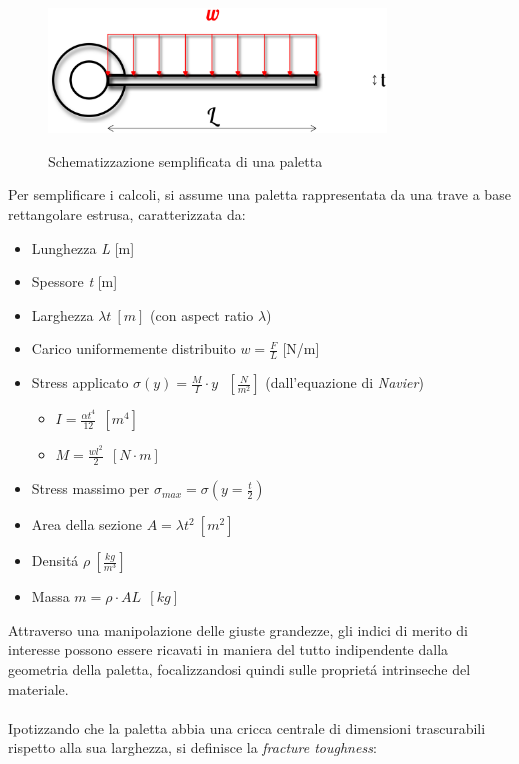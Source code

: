 \documentclass{article}
\begin{document}
        \begin{figure}[h!]
            \centering
             \label{blade_load}
            \includegraphics[width=0.8\textwidth]{Sources/blade_load.eps}
            \caption{Schematizzazione semplificata di una paletta \autocite{Inkscape}}
        \end{figure}
        \clearpage

        Per semplificare i calcoli, si assume una paletta rappresentata da una trave a base rettangolare
        estrusa, caratterizzata da:

        \begin{itemize}
            \item Lunghezza \textit{L} [m]
            \item Spessore \textit{t} [m]
            \item Larghezza $\lambda t \ [m]$ (con aspect ratio $\lambda$)
            \item Carico uniformemente distribuito $w = \frac{F}{L}$ [N/m]
            \item Stress applicato $\sigma(y) = \frac{M}{I} \cdot y \ \ \ [\frac{N}{m^2}]$ (dall'equazione di \textit{Navier})
                \begin{itemize}
                    \item $I = \frac{\alpha t^4}{12} \ \ [m^4]$ 
                    \item $M = \frac{wl^2}{2} \ \ [N \cdot m]$
                \end{itemize}
            \item Stress massimo per $\sigma_{max} = \sigma(y = \frac{t}{2})$
            \item Area della sezione $A = \lambda t^2 \ [m^2]$
            \item Densitá $\rho \ [\frac{kg}{m^3}]$
            \item Massa $m = \rho \cdot AL \ \ [kg]$
        \end{itemize}

        Attraverso una manipolazione delle giuste grandezze, gli indici di merito di interesse possono essere ricavati 
        in maniera del tutto indipendente dalla geometria della paletta, focalizzandosi quindi
        sulle proprietá intrinseche del materiale.
        \\ \\ 
        Ipotizzando che la paletta abbia una cricca centrale di dimensioni trascurabili
        rispetto alla sua larghezza, si definisce la \textit{fracture toughness}:
\end{document}
